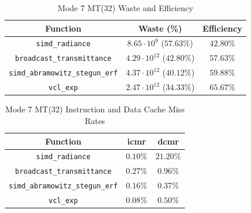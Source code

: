 \documentclass[a4paper, 11pt]{memoir}
\begin{document}
    \begin{table}[ht]
        \centering
        \begin{tabular}{|c|c|c|}
            \hline
            Function                                     & Waste (\%)                       & Efficiency\\\hline
            \texttt{simd_radiance}              & $8.65 \cdot 10^{9}$ ($57.63\%$) & $42.80\%$\\
            \texttt{broadcast_transmittance}    & $4.29 \cdot 10^{12}$ ($42.80\%$) & $57.63\%$\\
            \texttt{simd_abramowitz_stegun_erf} & $4.37 \cdot 10^{12}$ ($40.12\%$) & $59.88\%$\\
            \texttt{vcl_exp}                    & $2.47 \cdot 10^{12}$ ($34.33\%$) & $65.67\%$\\
            \hline
        \end{tabular}
        \caption{Mode 7 MT(32) Waste and Efficiency}
        \label{tab:mode_7_mt_wae}
    \end{table}

    \begin{table}[ht]
        \centering
        \begin{tabular}{|c|c|c|}
            \hline
            Function                                     & icmr     & dcmr\\\hline
            \texttt{simd_radiance}              & $0.10\%$ & $21.20\%$\\
            \texttt{broadcast_transmittance}    & $0.27\%$ & $0.96\%$\\
            \texttt{simd_abramowitz_stegun_erf} & $0.16\%$ & $0.37\%$\\
            \texttt{vcl_exp}                    & $0.08\%$ & $0.50\%$\\
            \hline
        \end{tabular}
        \caption{Mode 7 MT(32) Instruction and Data Cache Miss Rates}
        \label{tab:mode_7_mt_cmr}
    \end{table}
\end{document}
